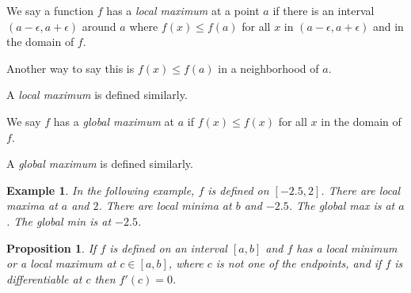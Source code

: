 \documentclass[11pt]{book}
\newtheorem{prop}{Proposition}
\newtheorem{example}{Example}
\numberwithin{example}{chapter}
\begin{document}
We say a function $f$ has a \emph{local maximum} at a point $a$ if there is an interval $(a-\epsilon,a+\epsilon)$ around $a$ where $f(x)\leq f(a)$ for all $x$ in $(a-\epsilon,a+\epsilon)$ and in the domain of $f$. 

Another way to say this is $f(x)\leq f(a)$ in a neighborhood of $a$.  

A \emph{local maximum} is defined similarly.  


We say $f$ has a \emph{global maximum} at $a$ if $f(x)\leq f(x)$ for all $x$ in the domain of $f$.  

A \emph{global maximum} is defined similarly.  

\begin{example}

In the following example, $f$ is defined on $[-2.5,2]$.  There are local maxima at $a$ and $2$.  There are local minima at $b$ and $-2.5$.  The global max is at $a$.  The global min is at $-2.5$.  




\begin{center}
\end{center}

\end{example}


\begin{prop}
If $f$ is defined on an interval $[a,b]$ and $f$ has a local minimum or a local maximum at $c \in [a,b]$, where $c$ is not one of the endpoints, and if $f$ is differentiable at $c$ then $f'(c)=0$.   
\end{prop}
\end{document}
